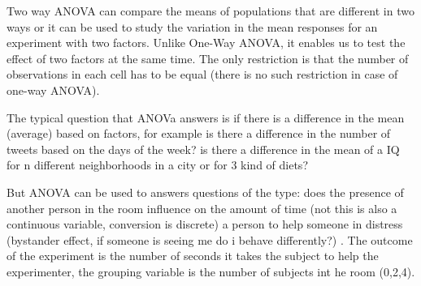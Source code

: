 \documentclass[11pt]{article}
\theoremstyle{definition}
\theoremstyle{remark}
\begin{document}
Two way ANOVA can compare the means of populations that are different in two ways or it can be used to study the variation in the mean responses for an experiment with two factors. Unlike One-Way ANOVA, it enables us to test the effect of two factors at the same time. The only restriction is that the number of observations in each cell has to be equal (there is no such restriction in case of one-way ANOVA).



The typical question that ANOVa answers is if there is a difference in the mean (average) based on factors, for example is there a difference in the number of tweets based on the days of the week? is there a difference in the mean of a IQ for n different neighborhoods in a city or for 3 kind of diets?

But ANOVA can be used to answers questions of the type: does the presence of another person in the room influence on the amount of time (not this is also a continuous variable, conversion is discrete) a person to help someone in distress (bystander effect, if someone is seeing me do i behave differently?) \cite{darley1968bystander}. The outcome of the experiment is the number of seconds it takes the subject to help the experimenter, the grouping variable is the number of subjects int he room (0,2,4).
\end{document}
